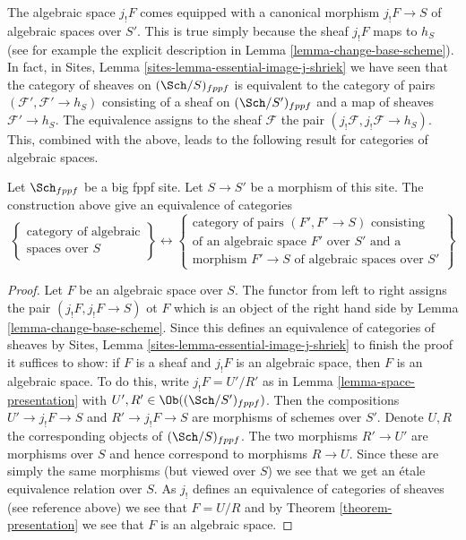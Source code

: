 \noindent
The algebraic space $j_!F$ comes equipped with a canonical morphism
$j_!F \to S$ of algebraic spaces over $S'$. This is true simply
because the sheaf $j_!F$ maps to $h_S$ (see for example the
explicit description in
Lemma \ref{lemma-change-base-scheme}).
In fact, in
Sites, Lemma \ref{sites-lemma-essential-image-j-shriek}
we have seen that the category of sheaves on $(\Sch/S)_{fppf}$
is equivalent to the category of pairs $(\mathcal{F}', \mathcal{F}' \to h_S)$
consisting of a sheaf on $(\Sch/S')_{fppf}$ and a map of sheaves
$\mathcal{F}' \to h_S$. The equivalence assigns to the sheaf $\mathcal{F}$
the pair $(j_!\mathcal{F}, j_!\mathcal{F} \to h_S)$.
This, combined with the above, leads to the following
result for categories of algebraic spaces.

\begin{lemma}
\label{lemma-category-of-spaces-over-smaller-base-scheme}
Let $\Sch_{fppf}$ be a big fppf site.
Let $S \to S'$ be a morphism of this site.
The construction above give an equivalence of
categories
$$
\left\{
\begin{matrix}
\text{category of algebraic}\\
\text{spaces over }S
\end{matrix}
\right\}
\leftrightarrow
\left\{
\begin{matrix}
\text{category of pairs }(F', F' \to S)\text{ consisting}\\
\text{of an algebraic space }F'\text{ over }S'\text{ and a}\\
\text{morphism }F' \to S\text{ of algebraic spaces over }S'
\end{matrix}
\right\}
$$
\end{lemma}

\begin{proof}
Let $F$ be an algebraic space over $S$. The functor from left to right
assigns the pair $(j_!F, j_!F \to S)$ ot $F$
which is an object of the right hand side by
Lemma \ref{lemma-change-base-scheme}.
Since this defines an equivalence of categories of sheaves by
Sites, Lemma \ref{sites-lemma-essential-image-j-shriek}
to finish the proof it suffices to show:
if $F$ is a sheaf and $j_!F$ is an algebraic space, then $F$
is an algebraic space. To do this, write
$j_!F = U'/R'$ as in
Lemma \ref{lemma-space-presentation}
with $U', R' \in \Ob((\Sch/S')_{fppf})$.
Then the compositions $U' \to j_!F \to S$ and $R' \to j_!F \to S$
are morphisms of schemes over $S'$. Denote $U, R$ the corresponding
objects of $(\Sch/S)_{fppf}$. The two morphisms
$R' \to U'$ are morphisms over $S$ and hence correspond to
morphisms $R \to U$. Since these are simply the same
morphisms (but viewed over $S$) we see that we get an \'etale
equivalence relation over $S$. As $j_!$ defines an equivalence of
categories of sheaves (see reference above) we see that
$F = U/R$ and by
Theorem \ref{theorem-presentation}
we see that $F$ is an algebraic space.
\end{proof}

